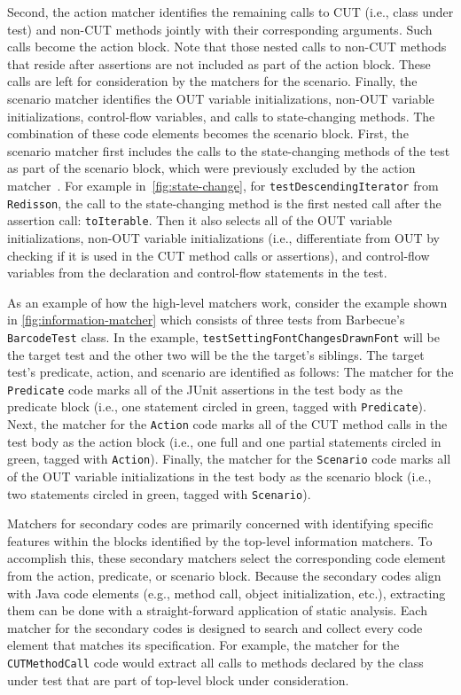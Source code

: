 Second, the action matcher identifies the remaining calls to CUT (i.e., class under test) and non-CUT methods jointly with their corresponding arguments.
%
Such calls become the action block.
%
Note that those nested calls to non-CUT methods that reside after assertions are not included as part of the action block.
%
These calls are left for consideration by the matchers for the scenario.
%
Finally, the scenario matcher identifies the OUT variable initializations, non-OUT variable initializations, control-flow variables, and calls to state-changing methods.
%
The combination of these code elements becomes the scenario block.
%
First, the scenario matcher first includes the calls to the state-changing methods of the test as part of the scenario block, which were previously excluded by the action matcher~\cite{zhang2016towards, wu2020pattern}.
%
For example in~\cref{fig:state-change}, for \texttt{testDescendingIterator} from \texttt{Redisson}, the call to the state-changing method is the first nested call after the assertion call: \texttt{toIterable}.
%
Then it also selects all of the OUT variable initializations, non-OUT variable initializations (i.e., differentiate from OUT by checking if it is used in the CUT method calls or assertions), and control-flow variables from the declaration and control-flow statements in the test.


As an example of how the high-level matchers work, consider the example shown in \cref{fig:information-matcher} which consists of three tests from Barbecue's \texttt{BarcodeTest} class.
% 
In the example, \texttt{testSettingFontChangesDrawnFont} will be the target test and the other two will be the the target's siblings.
%
The target test's predicate, action, and scenario are identified as follows:
%
The matcher for the \texttt{Predicate} code marks all of the JUnit assertions in the test body as the predicate block (i.e., one statement circled in green, tagged with \texttt{Predicate}).
%
Next, the matcher for the \texttt{Action} code marks all of the CUT method calls in the test body as the action block (i.e., one full and one partial statements circled in green, tagged with \texttt{Action}).
%
Finally, the matcher for the \texttt{Scenario} code marks all of the OUT variable initializations in the test body as the scenario block (i.e., two statements circled in green, tagged with \texttt{Scenario}).


Matchers for secondary codes are primarily concerned with identifying specific features within the blocks identified by the top-level information matchers.
%
To accomplish this, these secondary matchers select the corresponding code element from the action, predicate, or scenario block.
%
Because the secondary codes align with Java code elements (e.g., method call, object initialization, etc.), extracting them can be done with a straight-forward application of static analysis.
%
Each matcher for the secondary codes is designed to search and collect every code element that matches its specification.
%
For example, the matcher for the \texttt{CUTMethodCall} code would extract all calls to methods declared by the class under test that are part of top-level block under consideration.


